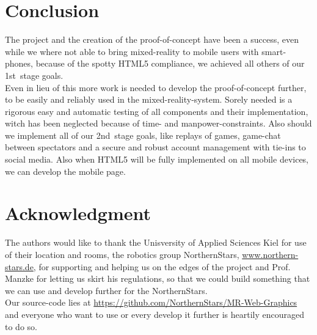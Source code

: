 \documentclass[journal]{IEEEtran}
\begin{document}
\section{Conclusion}
The project and the creation of the proof-of-concept have been a success, even
while we where not able to bring mixed-reality to mobile users with smart-phones, because of the spotty HTML5 compliance, we achieved all others of our 1st~stage goals.\\
Even in lieu of this more work is needed to develop the proof-of-concept
further, to be easily and reliably used in the mixed-reality-system. Sorely needed is a rigorous easy  and automatic testing of all components and their implementation, witch has been neglected because of time- and manpower-constraints. Also should we implement all of our 2nd~stage goals, like replays of games, game-chat between spectators and a secure and robust account management with tie-ins to social media. Also when HTML5 will be fully implemented on all mobile devices, we can develop the mobile page.
\section*{Acknowledgment}
The authors would like to thank the Unisversity of Applied Sciences Kiel for use
of their location and rooms, the robotics group NorthernStars,
\url{www.northern-stars.de}, for supporting and helping us on the edges of the project and Prof. Manzke for letting us skirt his regulations, so that we could build something that we can use and develop further for the NorthernStars.\\
Our source-code lies at \url{https://github.com/NorthernStars/MR-Web-Graphics} and everyone who want to use or every develop it further is heartily encouraged to do so.
\end{document}
